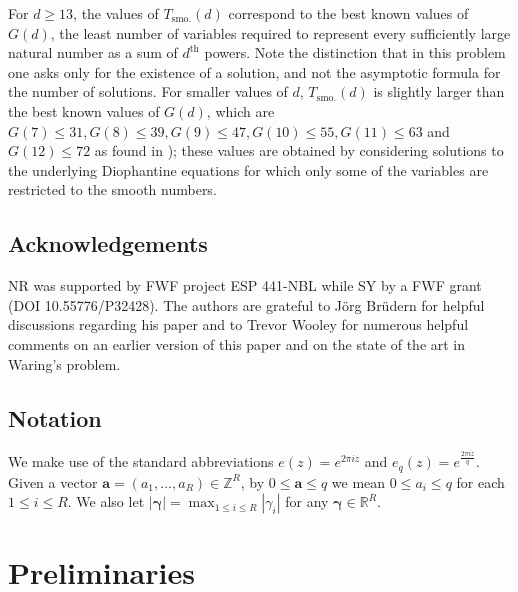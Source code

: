 \documentclass[reqno, 12pt, reqno]{amsart}
\numberwithin{equation}{section}
\newcommand{\ZZ}{\mathbb{Z}}
\newcommand{\RR}{\mathbb{R}}
\renewcommand{\leq}{\leqslant}
\renewcommand{\geq}{\geqslant}
\renewcommand{\a}{\mathbf{a}}
\newcommand{\bgamma}{\boldsymbol{\gamma}}
\renewcommand{\=}{\equiv}
\begin{document}
For $d \geq 13$, the values of $T_{\text{smo.}}(d)$ correspond to the best known values of $G(d)$, the least number of variables required to represent every sufficiently large natural number as a sum of $d^\text{th}$ powers. Note the distinction that in this problem one asks only for the existence of a solution, and
not the asymptotic formula for the number of solutions. For smaller values of $d$, $T_{\text{smo.}}(d)$ is slightly larger than the best known values of $G(d)$,
which are $G(7) \leq 31, G(8) \leq 39, G(9) \leq  47, G(10)   \leq 55, G(11)\leq 63$ and $G(12)\leq 72$ as found in \cite{intermediate});
these values are obtained by considering solutions to the underlying Diophantine equations for which only some of the variables are restricted to the smooth numbers.



\subsection*{Acknowledgements}
NR was supported by FWF project ESP 441-NBL while SY by a FWF grant (DOI 10.55776/P32428).
The authors are grateful to J\"{o}rg Br\"{u}dern for helpful discussions regarding his paper \cite{BC}
and to Trevor Wooley for numerous helpful comments on an earlier version of this paper and on the state of the art in Waring's problem.


\subsection*{Notation}
We make use of the standard abbreviations $e(z) = e^{2\pi i z}$ and $e_q(z) = e^{\frac{2 \pi i z}{q}}$.
Given a vector $\a = (a_1, \ldots, a_R) \in \ZZ^R$, by $0 \leq \a \leq q$ we mean $0 \leq a_i \leq q$ for each $1 \leq i \leq R$.
We also let $|\bgamma| = \max_{1 \leq i \leq R} |\gamma_i|$ for any  $\bgamma \in \RR^R.$

\section{Preliminaries}
%
\end{document}
